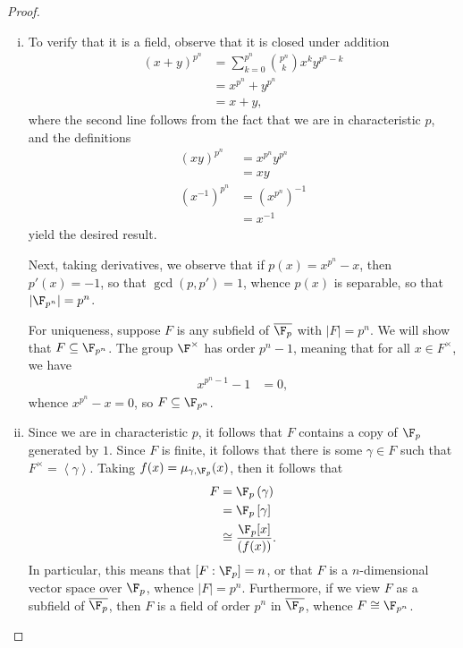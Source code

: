 \documentclass[10pt]{mypackage}
\begin{document}
\begin{proof}\hfill
  \begin{enumerate}[(i)]
    \item To verify that it is a field, observe that it is closed under addition 
      \begin{align*}
        \left( x + y \right)^{p^{n}} &= \sum_{k=0}^{p^{n}} {p^{n}\choose k} x^{k}y^{p^{n}-k}\\
                                     &= x^{p^{n}} + y^{p^{n}}\\
                                     &= x + y,
      \end{align*}
      where the second line follows from the fact that we are in characteristic $p$, and the definitions
      \begin{align*}
        \left( xy \right)^{p^{n}} &= x^{p^{n}}y^{p^{n}}\\
                                  &= xy\\
        \left( x^{-1} \right)^{p^{n}} &= \left( x^{p^{n}} \right)^{-1}\\
                                      &= x^{-1}
      \end{align*}
      yield the desired result.

      Next, taking derivatives, we observe that if $p(x) = x^{p^{n}}-x$, then $p'(x) = -1$, so that $\gcd\left( p,p' \right) = 1$, whence $p(x)$ is separable, so that $\left\vert \F_{p^n} \right\vert = p^{n}$.

      For uniqueness, suppose $F$ is any subfield of $ \overline{\F_p} $ with $\left\vert F \right\vert = p^{n}$. We will show that $F\subseteq \F_{p^{n}}$. The group $\F^{\times}$ has order $p^{n}-1$, meaning that for all $x\in F^{\times}$, we have
      \begin{align*}
        x^{p^{n}-1}-1 &= 0,
      \end{align*}
      whence $x^{p^{n}}-x = 0$, so $F\subseteq \F_{p^{n}}$.
    \item Since we are in characteristic $p$, it follows that $F$ contains a copy of $\F_p$ generated by $1$. Since $F$ is finite, it follows that there is some $\gamma\in F$ such that $F^{\times} = \left\langle \gamma \right\rangle$. Taking $f(x) = \mu_{\gamma,\F_p}(x)$, then it follows that
      \begin{align*}
        F &= \F_p\left( \gamma \right)\\
          &= \F_p\left[ \gamma \right]\\
          &\cong \frac{\F_p[x]}{\left( f(x) \right)}.
      \end{align*}
      In particular, this means that $\left[ F:\F_p \right] = n$, or that $F$ is a $n$-dimensional vector space over $\F_p$, whence $\left\vert F \right\vert = p^{n}$. Furthermore, if we view $F$ as a subfield of $ \overline{\F_p} $, then $F$ is a field of order $p^{n}$ in $ \overline{\F_p} $, whence $F\cong \F_{p^{n}}$.
  \end{enumerate}
\end{proof}
\end{document}
